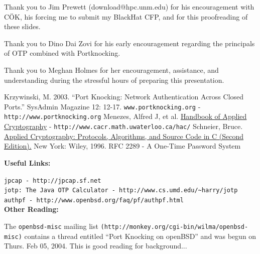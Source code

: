 \documentclass[landscape,twocolumn,headrule]{foils}
\begin{document}

Thank you to Jim Prewett (download@hpc.unm.edu) for his encouragement with C\"{O}K, his forcing me to submit my BlackHat CFP, and for this proofreading of these slides.

Thank you to Dino Dai Zovi for his early encouragement regarding the principals of OTP combined with Portknocking.

Thank you to Meghan Holmes for her encouragement, assistance, and understanding during the stressful hours of preparing this presentation.

\tiny
\begin{thebibliography}{99}
 Krzywinski, M.  2003.  ``Port Knocking: Network Authentication Across Closed Ports.'' SysAdmin Magazine 12: 12-17.
 \texttt{www.portknocking.org} - \verb;http://www.portknocking.org;
 Menezes, Alfred J, et al. \underline{Handbook of Applied Cryptography} - \verb;http://www.cacr.math.uwaterloo.ca/hac/;
 Schneier, Bruce. \underline{Applied Cryptography: Protocols, Algorithms, and Source Code in C (Second Edition).} New York: Wiley, 1996.
 RFC 2289 - A One-Time Password System
\end{thebibliography}

\large
\textbf{Useful Links:}

\tiny
\verb;jpcap - http://jpcap.sf.net;\\
\verb;jotp: The Java OTP Calculator - http://www.cs.umd.edu/~harry/jotp;\\
\verb;authpf - http://www.openbsd.org/faq/pf/authpf.html;\\

\large
\textbf{Other Reading:}

\tiny
The \texttt{openbsd-misc} mailing list \verb;(http://monkey.org/cgi-bin/wilma/openbsd-misc);  contains a thread entitled ``Port Knocking on openBSD'' and was begun on Thurs. Feb 05, 2004.  This is good reading for background...
\end{document}
